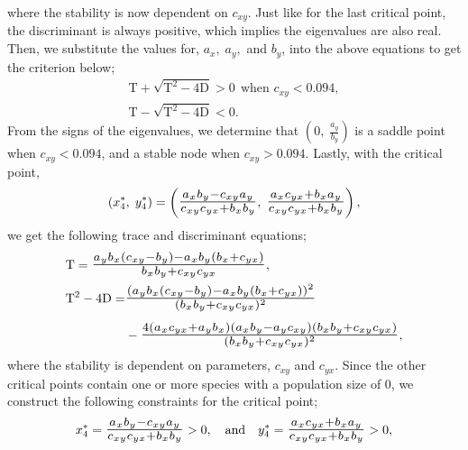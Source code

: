 where the stability is now dependent on $c_{xy}$.
Just like for the last critical point, the discriminant is always positive, which implies the eigenvalues are also real.
Then, we substitute the values for, $a_x,\;a_y,$ and $b_y$, into the above equations to get the criterion below;
\begin{equation*}
    \begin{array}{l}
        \mathrm{T}+\sqrt{\mathrm{T}^2-4\mathrm{D}}>0\ \ \text{when \ } c_{xy}<0.094,  \\
        \mathrm{T}-\sqrt{\mathrm{T}^2-4\mathrm{D}}<0.
    \end{array}
\end{equation*}
From the signs of the eigenvalues, we determine that $\displaystyle\left(0,\;\frac{a_y}{b_y}\right)$ is a saddle point when $c_{xy}<0.094$, and a stable node when $c_{xy}>0.094$.
Lastly, with the critical point,
\begin{equation*}
    \left(x_4^*,\;y_4^*\right) = \left(\scalebox{1.3}{$\frac{a_xb_y-c_{xy}a_y}{c_{xy}c_{yx}+b_xb_y}$},\; \scalebox{1.3}{$\frac{a_xc_{yx}+b_xa_y}{c_{xy}c_{yx}+b_xb_y}$}\right),
\end{equation*}
we get the following trace and discriminant equations;
\begin{equation*}
    \begin{array}{l}
        \mathrm{T}= \scalebox{1.3}{$\frac{a_y b_x (c_{xy}-b_y)-a_x b_y (b_x+c_{yx})}{b_x b_y+c_{xy} c_{yx}}$}, \\[.3cm]
        \begin{aligned}
            \mathrm{T}^2 - 4\mathrm{D}=& \scalebox{1.3}{$\frac{(a_y b_x (c_{xy}-b_y)-a_x b_y (b_x+c_{yx}))^2}{(b_x b_y+c_{xy} c_{yx})^2}$}\\[.2cm]
            &- \scalebox{1.3}{$\frac{4 (a_x c_{yx}+a_y b_x) (a_x b_y-a_y c_{xy}) (b_x b_y+c_{xy} c_{yx})}{(b_x b_y+c_{xy} c_{yx})^2}$},
        \end{aligned}
    \end{array}
\end{equation*}
where the stability is dependent on parameters, $c_{xy}$ and $c_{yx}$.
Since the other critical points contain one or more species with a population size of 0, we construct the following constraints for the critical point;
\begin{equation*}
    x_4^* = \scalebox{1.3}{$\frac{a_xb_y-c_{xy}a_y}{c_{xy}c_{yx}+b_xb_y}$}>0,\quad \text{and}\quad y_4^* = \scalebox{1.3}{$\frac{a_xc_{yx}+b_xa_y}{c_{xy}c_{yx}+b_xb_y}$}>0,
\end{equation*}
